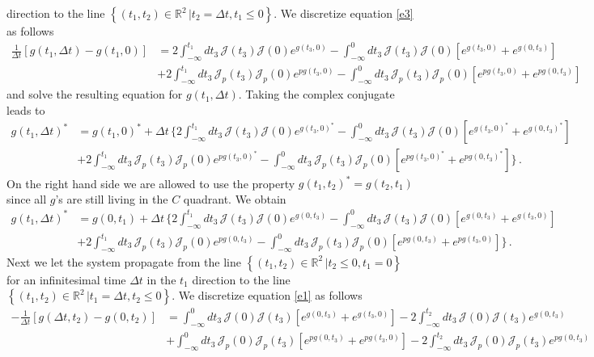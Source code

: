 \documentclass[prx,aps,onecolumn,amsfonts,showpacs,superscriptaddress,preprint,eqsecnum]
{revtex4-1}
\newcommand{\nn}{\nonumber \\}
\begin{document}
direction to the line $\left\{(t_1,t_2)\in \mathbb{R}^2 \,| t_2 = \Delta t, t_1\leq 0 \right\}$. 
We discretize equation \eqref{e3} as follows
\begin{align}
\frac{1}{\Delta t} \left[ g(t_1,\Delta t) - g(t_1,0) \right] &= 2 \int_{-\infty}^{t_1} dt_3  \, \mathcal{J}(t_3) \mathcal{J}(0) e^{g(t_3,0)} 
-  \int_{-\infty}^{0} dt_3  \, \mathcal{J}(t_3) \mathcal{J}(0) \left[ e^{g(t_3,0)} + e^{g (0,t_3)} \right] \nn
&+ 2 \int_{-\infty}^{t_1} dt_3  \, \mathcal{J}_p(t_3) \mathcal{J}_p(0) e^{pg(t_3,0)} 
-  \int_{-\infty}^{0} dt_3  \, \mathcal{J}_p(t_3) \mathcal{J}_p (0) \left[ e^{pg(t_3,0)} + e^{pg (0,t_3)} \right]  
\end{align}	
and  solve the resulting equation for $g(t_1,\Delta t)$. Taking the complex conjugate leads to
\begin{align}
 g(t_1,\Delta t)^{\ast} &=g(t_1,0)^{\ast} + \Delta t \,  \Bigg\{  2 \int_{-\infty}^{t_1} dt_3  \, \mathcal{J}(t_3) \mathcal{J}(0) e^{g(t_3,0)^{\ast}} 
-  \int_{-\infty}^{0} dt_3  \, \mathcal{J}(t_3) \mathcal{J}(0) \left[ e^{g(t_3,0)^{\ast}} + e^{g (0,t_3)^{\ast}} \right] \nn
&+ 2 \int_{-\infty}^{t_1} dt_3  \, \mathcal{J}_p(t_3) \mathcal{J}_p(0) e^{pg(t_3,0)^{\ast}} 
-  \int_{-\infty}^{0} dt_3  \, \mathcal{J}_p(t_3) \mathcal{J}_p (0) \left[ e^{pg(t_3,0)^{\ast}} + e^{pg (0,t_3)^{\ast}} \right]  \Bigg\}\,.
\label{e6}
\end{align}
On the right hand side we are allowed to use the property $g(t_1,t_2)^{\ast} = g(t_2,t_1)$
since all $g$'s are still living in the $C$ quadrant.
We obtain
\begin{align}
 g(t_1,\Delta t)^{\ast} &=g(0,t_1) + \Delta t \,  \Bigg\{  2 \int_{-\infty}^{t_1} dt_3  \, \mathcal{J}(t_3) \mathcal{J}(0) e^{g(0,t_3)} 
-  \int_{-\infty}^{0} dt_3  \, \mathcal{J}(t_3) \mathcal{J}(0) \left[ e^{g(0,t_3)} + e^{g (t_3,0)} \right] \nn
&+ 2 \int_{-\infty}^{t_1} dt_3  \, \mathcal{J}_p(t_3) \mathcal{J}_p(0) e^{pg(0,t_3)} 
-  \int_{-\infty}^{0} dt_3  \, \mathcal{J}_p(t_3) \mathcal{J}_p (0) \left[ e^{pg(0,t_3)} + e^{pg (t_3,0)} \right]  \Bigg\}\,.
\end{align}
Next we let the system propagate from the line $\left\{(t_1,t_2)\in \mathbb{R}^2 \,| t_2 \leq 0, t_1 = 0 \right\}$ for an infinitesimal time $\Delta t$ in the $t_1$  
direction to the line $\left\{(t_1,t_2)\in \mathbb{R}^2 \,| t_1 = \Delta t, t_2\leq 0 \right\}$. 
We discretize equation \eqref{e1} as follows
\begin{align}
-\frac{1}{\Delta t} \left[ g(\Delta t,t_2) - g(0,t_2) \right] &=  \int_{-\infty}^{0} dt_3 \, \mathcal{J}(0) \mathcal{J}(t_3) \left[ e^{g(0,t_3)} + e^{g(t_3,0)} \right]  
- 2 \int_{-\infty}^{t_2} dt_3  \, \mathcal{J}(0) \mathcal{J}(t_3) e^{g(0,t_3)}   \nn
&+  \int_{-\infty}^{0} dt_3 \, \mathcal{J}_p (0) \mathcal{J}_p (t_3) \left[ e^{pg(0,t_3)} + e^{pg(t_3,0)} \right]  
- 2 \int_{-\infty}^{t_2} dt_3  \, \mathcal{J}_p (0) \mathcal{J}_p (t_3) e^{pg(0,t_3)}\,
\end{align}	
\end{document}
